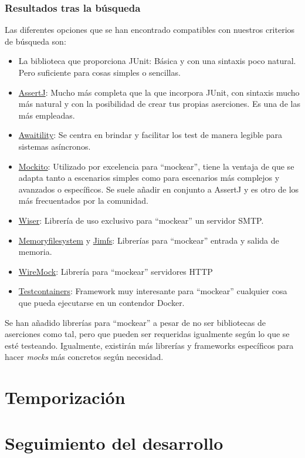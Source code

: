 \subsubsection{Resultados tras la búsqueda}

Las diferentes opciones que se han encontrado compatibles con nuestros criterios
de búsqueda son:

\begin{itemize}
    \item La biblioteca que proporciona JUnit: Básica y con una sintaxis poco
    natural. Pero suficiente para cosas simples o sencillas.
    \item \href{https://github.com/assertj/assertj}{AssertJ}: Mucho más completa
    que la que incorpora JUnit, con sintaxis mucho más natural y con la
    posibilidad de crear tus propias aserciones. Es una de las más empleadas.
    \item \href{http://www.awaitility.org/}{Awaitility}: Se centra en brindar y
    facilitar los test de manera legible para sistemas asíncronos.
    \item \href{https://site.mockito.org/}{Mockito}: Utilizado por excelencia para
    ``mockear'', tiene la ventaja de que se adapta tanto a escenarios simples
    como para escenarios más complejos y avanzados o específicos. Se suele
    añadir en conjunto a AssertJ y es otro de los más frecuentados por la comunidad.
    \item \href{https://github.com/voodoodyne/subethasmtp}{Wiser}: Librería de
    uso exclusivo para ``mockear'' un servidor SMTP. 
    \item \href{https://github.com/marschall/memoryfilesystem}{Memoryfilesystem}
    y \href{https://github.com/google/jimfs}{Jimfs}: Librerías para
    ``mockear'' entrada y salida de memoria. 
    \item \href{https://wiremock.org/docs/overview/}{WireMock}: Librería para
    ``mockear'' servidores HTTP
    \item \href{https://testcontainers.com/}{Testcontainers}: Framework muy
    interesante para ``mockear'' cualquier cosa que pueda ejecutarse en un
    contendor Docker. 
\end{itemize}

Se han añadido librerías para ``mockear'' a pesar de no ser bibliotecas de
aserciones como tal, pero que pueden ser requeridas igualmente según lo que se
esté testeando. Igualmente, existirán más librerías y frameworks específicos para hacer
\emph{mocks} más concretos según necesidad.



\section{Temporización}

\section{Seguimiento del desarrollo}
